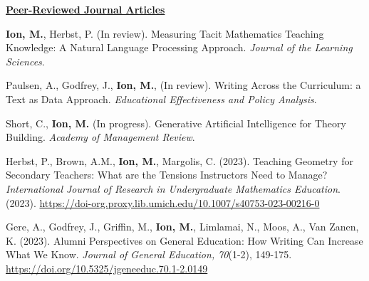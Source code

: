 \documentclass[margin,line]{res}
\newenvironment{list3}{
        \begin{list}{\ding{113}}{%
            \setlength{\itemsep}{0in}
            \setlength{\parsep}{0in} \setlength{\parskip}{0in}
            \setlength{\topsep}{0in} \setlength{\partopsep}{0in}
            \setlength{\leftmargin}{0in}
            \setlength{\rightmargin}{1.25in}}}{\end{list}}
\renewcommand{\subsection}[1]{%
      \par\vspace{3pt}%
      \underline{\normalsize\bfseries #1}%
      \par\vspace{3pt}%
    }
\begin{document}
\begin{resume}
\subsection{\sc Peer-Reviewed Journal Articles} 
\begin{list3} 
  \item \textbf{Ion, M.}, Herbst, P. (In review). Measuring Tacit Mathematics Teaching Knowledge: A Natural Language Processing Approach. \textit{Journal of the Learning Sciences}. 
  \item Paulsen, A., Godfrey, J., \textbf{Ion, M.}, (In review). Writing Across the Curriculum: a Text as Data Approach. \textit{Educational Effectiveness and Policy Analysis}. 
  \item Short, C., \textbf{Ion, M.} (In progress). Generative Artificial Intelligence for Theory Building. \textit{Academy of Management Review}. 
  \item Herbst, P., Brown, A.M., \textbf{Ion, M.}, Margolis, C. (2023). Teaching Geometry for Secondary Teachers: What are the Tensions Instructors Need to Manage? \textit{International Journal of Research in Undergraduate Mathematics Education}. (2023). \url{https://doi-org.proxy.lib.umich.edu/10.1007/s40753-023-00216-0}
  \item Gere, A., Godfrey, J., Griffin, M., \textbf{Ion, M.}, Limlamai, N., Moos, A., Van Zanen, K. (2023). Alumni Perspectives on General Education: How Writing Can Increase What We Know. \textit{Journal of General Education, 70}(1-2), 149-175. \url{https://doi.org/10.5325/jgeneeduc.70.1-2.0149}
\end{list3}


\end{resume}
\end{document}
